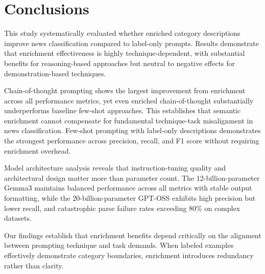 \documentclass[sigconf,nonacm]{acmart}
\begin{document}
\section{Conclusions}

This study systematically evaluated whether enriched category descriptions improve news classification compared to label-only prompts. Results demonstrate that enrichment effectiveness is highly technique-dependent, with substantial benefits for reasoning-based approaches but neutral to negative effects for demonstration-based techniques.

Chain-of-thought prompting shows the largest improvement from enrichment across all performance metrics, yet even enriched chain-of-thought substantially underperforms baseline few-shot approaches. This establishes that semantic enrichment cannot compensate for fundamental technique-task misalignment in news classification. Few-shot prompting with label-only descriptions demonstrates the strongest performance across precision, recall, and F1 score without requiring enrichment overhead.

Model architecture analysis reveals that instruction-tuning quality and architectural design matter more than parameter count. The 12-billion-parameter Gemma3 maintains balanced performance across all metrics with stable output formatting, while the 20-billion-parameter GPT-OSS exhibits high precision but lower recall, and catastrophic parse failure rates exceeding 80\% on complex datasets.

Our findings establish that enrichment benefits depend critically on the alignment between prompting technique and task demands. When labeled examples effectively demonstrate category boundaries, enrichment introduces redundancy rather than clarity.
\end{document}
